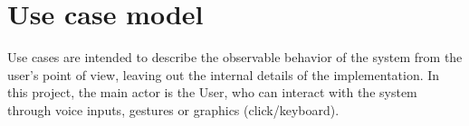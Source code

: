 \section{Use case model}
Use cases are intended to describe the observable behavior of the system from the user’s point of view, leaving out the internal details of the implementation.
In this project, the main actor is the User, who can interact with the system through voice inputs, gestures or graphics (click/keyboard).
